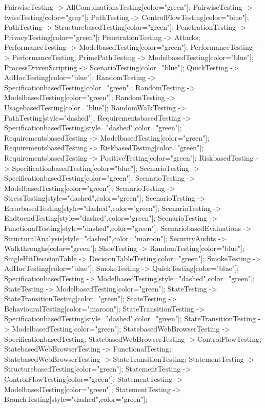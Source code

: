 \documentclass{article}
\begin{document}
{PairwiseTesting -> AllCombinationsTesting[color="green"];
PairwiseTesting -> twiseTesting[color="gray"];
PathTesting -> ControlFlowTesting[color="blue"];
PathTesting -> StructurebasedTesting[color="green"];
PenetrationTesting -> PrivacyTesting[color="green"];
PenetrationTesting -> Attacks;
PerformanceTesting -> ModelbasedTesting[color="green"];
PerformanceTesting -> PerformanceTesting;
PrimePathTesting -> ModelbasedTesting[color="blue"];
ProcessDrivenScripting -> ScenarioTesting[color="blue"];
QuickTesting -> AdHocTesting[color="blue"];
RandomTesting -> SpecificationbasedTesting[color="green"];
RandomTesting -> ModelbasedTesting[color="green"];
RandomTesting -> UsagebasedTesting[color="blue"];
RandomWalkTesting -> PathTesting[style="dashed"];
RequirementsbasedTesting -> SpecificationbasedTesting[style="dashed",color="green"];
RequirementsbasedTesting -> ModelbasedTesting[color="green"];
RequirementsbasedTesting -> RiskbasedTesting[color="green"];
RequirementsbasedTesting -> PositiveTesting[color="green"];
RiskbasedTesting -> SpecificationbasedTesting[color="blue"];
ScenarioTesting -> SpecificationbasedTesting[color="green"];
ScenarioTesting -> ModelbasedTesting[color="green"];
ScenarioTesting -> StressTesting[style="dashed",color="green"];
ScenarioTesting -> ErrorbasedTesting[style="dashed",color="green"];
ScenarioTesting -> EndtoendTesting[style="dashed",color="green"];
ScenarioTesting -> FunctionalTesting[style="dashed",color="green"];
ScenariobasedEvaluations -> StructuralAnalysis[style="dashed",color="maroon"];
SecurityAudits -> Walkthroughs[color="green"];
ShoeTesting -> RandomTesting[color="blue"];
SingleHitDecisionTable -> DecisionTableTesting[color="green"];
SmokeTesting -> AdHocTesting[color="blue"];
SmokeTesting -> QuickTesting[color="blue"];
SpecificationbasedTesting -> ModelbasedTesting[style="dashed",color="green"];
StateTesting -> ModelbasedTesting[color="green"];
StateTesting -> StateTransitionTesting[color="green"];
StateTesting -> BehaviouralTesting[color="maroon"];
StateTransitionTesting -> SpecificationbasedTesting[style="dashed",color="green"];
StateTransitionTesting -> ModelbasedTesting[color="green"];
StatebasedWebBrowserTesting -> SpecificationbasedTesting;
StatebasedWebBrowserTesting -> ControlFlowTesting;
StatebasedWebBrowserTesting -> FunctionalTesting;
StatebasedWebBrowserTesting -> StateTransitionTesting;
StatementTesting -> StructurebasedTesting[color="green"];
StatementTesting -> ControlFlowTesting[color="green"];
StatementTesting -> ModelbasedTesting[color="green"];
StatementTesting -> BranchTesting[style="dashed",color="green"];
}
\end{document}
